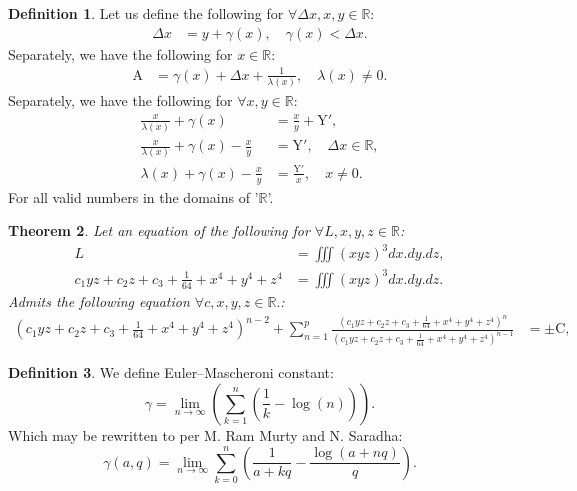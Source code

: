 \documentclass[10pt]{article}
\theoremstyle{plain}
\newtheorem{theorem}{Theorem}[section]
\theoremstyle{definition}
\newtheorem{definition}[theorem]{Definition}
\theoremstyle{remark}
\begin{document}
\begin{definition}
	Let us define the following for $\forall \Delta x, x, y \in \mathbb{R}$:
	\begin{align*}
	\Delta x &=	y + \gamma(x), \quad \gamma(x) < \Delta x.
	\end{align*}
  	Separately, we have the following for $x \in \mathbb{R}$:
	\begin{align*}
		\mathrm{A} &= \gamma(x)+\Delta x + \frac{1}{\lambda(x)}, \quad \lambda(x) \neq 0.
	\end{align*}
  Separately, we have the following  for $\forall x, y \in \mathbb{R}$:
	\begin{align*}
		\frac{x}{\lambda(x)} + \gamma(x) &= \frac{x}{y} + \mathrm{Y'},\\
		\frac{x}{\lambda(x)} + \gamma(x) - \frac{x}{y} &= \mathrm{Y'}, \quad \Delta x \in \mathbb{R},\\
		\lambda(x) + \gamma(x) -\frac{x}{y} &= \frac{\mathrm{Y'}}{x}, \quad x \neq 0.
	\end{align*}
	For all valid numbers in the domains of '$\mathbb{R}$'.
\end{definition}

\begin{theorem}
	Let an equation of the following for $\forall L, x, y, z \in \mathbb{R}$:
	\begin{align*}
		L &= \iiint (x y z)^{3} dx.dy.dz,\\
		c_{1} y z + c_{2} z + c_{3} + \frac{1}{64} + x^{4} + y^{4} + z^{4} &= \iiint (x y z)^{3} dx.dy.dz.
	\end{align*}
	Admits the following equation $\forall c, x, y, z \in \mathbb{R}.$:
	\begin{align*}
		(c_{1} y z + c_{2} z + c_{3} + \frac{1}{64} + x^{4} + y^{4} + z^{4})^{n-2} + \sum_{n=1}^{p} \frac{ (c_{1} y z + c_{2} z + c_{3} + \frac{1}{64} + x^{4} + y^{4} + z^{4})^{n}}{ (c_{1} y z + c_{2} z + c_{3} + \frac{1}{64} + x^{4} + y^{4} + z^{4})^{n-1}} &= \pm \mathrm{C},
	\end{align*}
\end{theorem}

\begin{definition}
	We define Euler–Mascheroni constant:
	\begin{equation}
		\gamma = \lim_{n \to \infty}(\sum_{k=1}^{n}(\frac{1}{k}-\log(n))).
	\end{equation}
	Which may be rewritten to per M. Ram Murty and N. Saradha:
	\begin{equation}
		\gamma(a, q) = \lim_{n \to \infty}\sum_{k=0}^{n}(\frac{1}{a+kq}-\frac{\log(a+nq)}{q}).
	\end{equation}
\end{definition}
\end{document}
